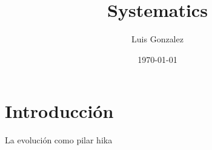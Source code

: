 \documentclass[12pt]{article}
\title{Systematics}
\author{Luis Gonzalez}
\date{\today}
\begin{document}
\maketitle

\section{Introducción}

La evolución como pilar
hika
\end{document}
